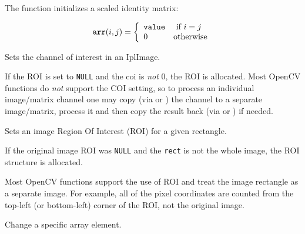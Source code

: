 The function initializes a scaled identity matrix:

\[
\texttt{arr}(i,j)=\left\{ \begin{array}{l l} \texttt{value} & \mbox{ if $i=j$}\\ 0 & \mbox{otherwise}\\ \end{array} \right.
\]

Sets the channel of interest in an IplImage.


\begin{description}
\end{description}

If the ROI is set to \texttt{NULL} and the coi is \textit{not} 0,
the ROI is allocated. Most OpenCV functions do \textit{not} support
the COI setting, so to process an individual image/matrix channel one
may copy (via  or ) the channel to a separate
image/matrix, process it and then copy the result back (via 
or ) if needed.

Sets an image Region Of Interest (ROI) for a given rectangle.


\begin{description}
\end{description}

If the original image ROI was \texttt{NULL} and the \texttt{rect} is not the whole image, the ROI structure is allocated.

Most OpenCV functions support the use of ROI and treat the image rectangle as a separate image. For example, all of the pixel coordinates are counted from the top-left (or bottom-left) corner of the ROI, not the original image.

\ifC %
Change a specific array element.



